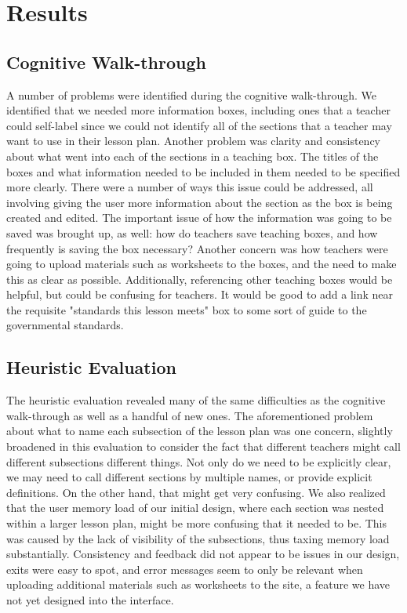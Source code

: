 \documentclass[10pt,letter]{article}
\begin{document}
\section{Results}
\subsection{Cognitive Walk-through}
A number of problems were identified during the cognitive walk-through.  We
identified that we needed more information boxes, including ones that a teacher
could self-label since we could not identify all of the sections that a teacher
may want to use in their lesson plan.  Another problem was clarity and
consistency about what went into each of the sections in a teaching box.  The
titles of the boxes and what information needed to be included in them needed to
be specified more clearly.  There were a number of ways this issue could be
addressed, all involving giving the user more information about the section as
the box is being created and edited.  The important issue of how the information
was going to be saved was brought up, as well: how do teachers save teaching
boxes, and how frequently is saving the box necessary?  Another concern was how
teachers were going to upload materials such as worksheets to the boxes, and the
need to make this as clear as possible.  Additionally, referencing other
teaching boxes would be helpful, but could be confusing for teachers.  It would
be good to add a link near the requisite "standards this lesson meets" box to
some sort of guide to the governmental standards.

\subsection{Heuristic Evaluation}
The heuristic evaluation revealed many of the same difficulties as the cognitive
walk-through as well as a handful of new ones.  The aforementioned problem about
what to name each subsection of the lesson plan was one concern, slightly
broadened in this evaluation to consider the fact that different teachers might
call different subsections different things.  Not only do we need to be
explicitly clear, we may need to call different sections by multiple names, or
provide explicit definitions.  On the other hand, that might get very confusing.
We also realized that the user memory load of our initial design, where each
section was nested within a larger lesson plan, might be more confusing that it
needed to be.  This was caused by the lack of visibility of the subsections,
thus taxing memory load substantially.  Consistency and feedback did not appear
to be issues in our design, exits were easy to spot, and error messages seem to
only be relevant when uploading additional materials such as worksheets to the
site, a feature we have not yet designed into the interface.
\end{document}
